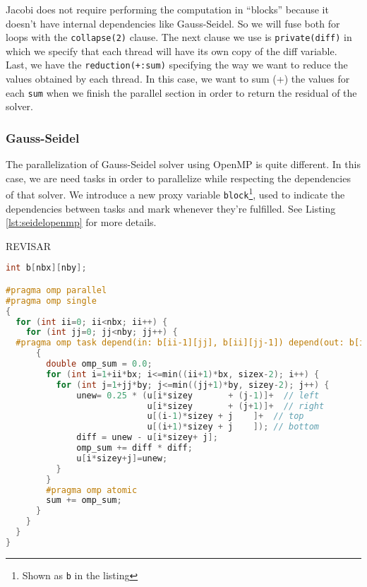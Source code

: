 \documentclass[a4paper, 10pt]{article}
\begin{document}
Jacobi does not require performing the computation in ``blocks'' because it doesn't have internal dependencies like Gauss-Seidel. 
So we will fuse both for loops with the \texttt{collapse(2)} clause. The next clause we use is \texttt{private(diff)} in which we specify 
that each thread will have its own copy of the diff variable. Last, we have the \texttt{reduction(+:sum)} specifying 
the way we want to reduce the values obtained by each thread. In this case, we want to sum (+) the values for each \texttt{sum} when we 
finish the parallel section in order to return the residual of the solver.

\clearpage

\subsubsection{Gauss-Seidel}

The parallelization of Gauss-Seidel solver using OpenMP is quite different. In this case, we are need tasks in order to parallelize while 
respecting the dependencies of that solver. We introduce a new proxy variable \texttt{block}\footnote{Shown as \texttt{b} in the listing}, used to indicate the dependencies between tasks and mark whenever they're fulfilled. See Listing \ref{lst:seidelopenmp} for more details.


{\huge{REVISAR}}



\begin{lstlisting}[language=c, caption={OpenMP pragma for Gauss-Seidel parallelization}, label={lst:seidelopenmp}]
    int b[nbx][nby];

#pragma omp parallel
#pragma omp single
{
  for (int ii=0; ii<nbx; ii++) {
    for (int jj=0; jj<nby; jj++) {
  #pragma omp task depend(in: b[ii-1][jj], b[ii][jj-1]) depend(out: b[ii][jj]) private(diff, unew) 
      {
        double omp_sum = 0.0;
        for (int i=1+ii*bx; i<=min((ii+1)*bx, sizex-2); i++) {
          for (int j=1+jj*by; j<=min((jj+1)*by, sizey-2); j++) {
              unew= 0.25 * (u[i*sizey	    + (j-1)]+  // left
                            u[i*sizey	    + (j+1)]+  // right
                            u[(i-1)*sizey + j    ]+  // top
                            u[(i+1)*sizey + j    ]); // bottom
              diff = unew - u[i*sizey+ j];
              omp_sum += diff * diff; 
              u[i*sizey+j]=unew;
          } 
        }
        #pragma omp atomic
        sum += omp_sum;
      }
    }
  }
}
\end{lstlisting}
\end{document}
